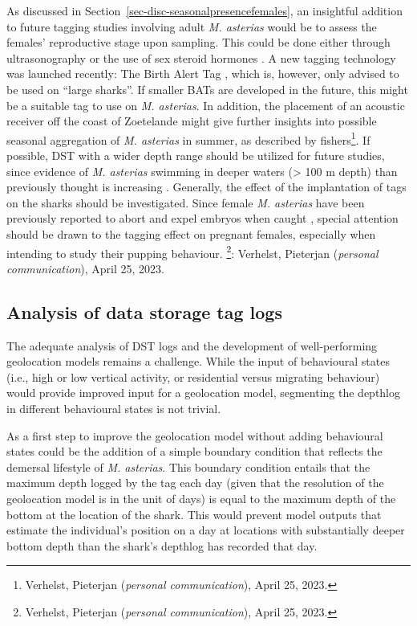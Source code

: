\documentclass[
  authoryear,
  review,
  3p]{elsarticle}
\begin{document}
As discussed in Section~\ref{sec-disc-seasonalpresencefemales}, an
insightful addition to future tagging studies involving adult \emph{M.
asterias} would be to assess the females' reproductive stage upon
sampling. This could be done either through ultrasonography or the use
of sex steroid hormones
\citep{awruch_2014, smukall_2019, anderson_2018, fujinami_2020, fujinami_2021}.
A new tagging technology was launched recently: The Birth Alert Tag
\citep[BAT,][]{sulikowski_2023}, which is, however, only advised to be
used on ``large sharks''. If smaller BATs are developed in the future,
this might be a suitable tag to use on \emph{M. asterias}. In addition,
the placement of an acoustic receiver off the coast of Zoetelande might
give further insights into possible seasonal aggregation of \emph{M.
asterias} in summer, as described by fishers\footnote{Verhelst,
  Pieterjan (\emph{personal communication}), April 25, 2023.}. If
possible, DST with a wider depth range should be utilized for future
studies, since evidence of \emph{M. asterias} swimming in deeper waters
(\textgreater{} 100 m depth) than previously thought is increasing
\citep{ices_2019, griffiths_2020}. Generally, the effect of the
implantation of tags on the sharks should be investigated. Since female
\emph{M. asterias} have been previously reported to abort and expel
embryos when caught \citep{farrell_2010a}, special attention should be
drawn to the tagging effect on pregnant females, especially when
intending to study their pupping behaviour. \footnote{Verhelst,
  Pieterjan (\emph{personal communication}), April 25, 2023.}: Verhelst,
Pieterjan (\emph{personal communication}), April 25, 2023.

\hypertarget{analysis-of-data-storage-tag-logs}{%
\subsection{Analysis of data storage tag
logs}\label{analysis-of-data-storage-tag-logs}}

The adequate analysis of DST logs and the development of well-performing
geolocation models remains a challenge. While the input of behavioural
states (i.e., high or low vertical activity, or residential versus
migrating behaviour) would provide improved input for a geolocation
model, segmenting the depthlog in different behavioural states is not
trivial.

As a first step to improve the geolocation model without adding
behavioural states could be the addition of a simple boundary condition
that reflects the demersal lifestyle of \emph{M. asterias}. This
boundary condition entails that the maximum depth logged by the tag each
day (given that the resolution of the geolocation model is in the unit
of days) is equal to the maximum depth of the bottom at the location of
the shark. This would prevent model outputs that estimate the
individual's position on a day at locations with substantially deeper
bottom depth than the shark's depthlog has recorded that day.
\end{document}
